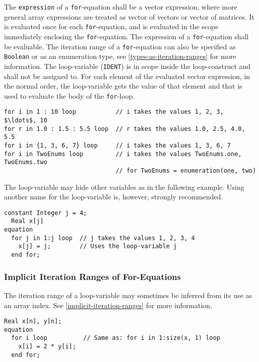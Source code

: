 The \lstinline!expression! of a \lstinline!for!-equation shall be a vector expression, where more general array expressions are treated as vector of vectors or vector of matrices.
It is evaluated once for each \lstinline!for!-equation, and is evaluated in the scope immediately enclosing the \lstinline!for!-equation.
The expression of a \lstinline!for!-equation shall be evaluable.
The iteration range of a \lstinline!for!-equation can also be specified as \lstinline!Boolean! or as an enumeration type, see \cref{types-as-iteration-ranges} for more information.
The loop-variable (\lstinline!IDENT!) is in scope inside the loop-construct and shall not be assigned to.
For each element of the evaluated vector expression, in the normal order, the loop-variable gets the value of that element and that is used to evaluate the body of the \lstinline!for!-loop.

\begin{example}
\begin{lstlisting}[language=modelica]
for i in 1 : 10 loop           // i takes the values 1, 2, 3, $\ldots$, 10
for r in 1.0 : 1.5 : 5.5 loop  // r takes the values 1.0, 2.5, 4.0, 5.5
for i in {1, 3, 6, 7} loop     // i takes the values 1, 3, 6, 7
for i in TwoEnums loop         // i takes the values TwoEnums.one, TwoEnums.two
                               // for TwoEnums = enumeration(one, two)
\end{lstlisting}

The loop-variable may hide other variables as in the following example.
Using another name for the loop-variable is, however, strongly recommended.
\begin{lstlisting}[language=modelica]
  constant Integer j = 4;
  Real x[j]
equation
  for j in 1:j loop  // j takes the values 1, 2, 3, 4
    x[j] = j;        // Uses the loop-variable j
  end for;
\end{lstlisting}
\end{example}


\subsubsection{Implicit Iteration Ranges of For-Equations}\label{implicit-iteration-ranges-of-for-equations}

The iteration range of a loop-variable may sometimes be inferred from its use as an array index.
See \cref{implicit-iteration-ranges} for more information.

\begin{example}
\begin{lstlisting}[language=modelica]
  Real x[n], y[n];
equation
  for i loop          // Same as: for i in 1:size(x, 1) loop
    x[i] = 2 * y[i];
  end for;
\end{lstlisting}
\end{example}


